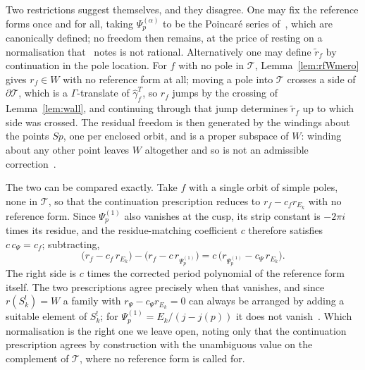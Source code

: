 \documentclass[11pt]{article}
\begin{document}
Two restrictions suggest themselves, and they disagree. One may fix the reference forms once and for
all, taking $\Psi^{(\alpha)}_p$ to be the Poincar\'e series of~\cite[Def.\ 3.1]{BrownFonseca2025},
which are canonically defined; no freedom then remains, at the price of resting on a normalisation
that~\cite[Rem.\ 5.17]{BrownFonseca2025} notes is not rational. Alternatively one may define
$\tilde r_f$ by continuation in the pole location. For $f$ with no pole in $\mathcal{T}$,
Lemma~\ref{lem:rfWmero} gives $r_f\in W$ with no reference form at all; moving a pole into
$\mathcal{T}$ crosses a side of $\partial\mathcal{T}$, which is a $\Gamma$-translate of
$\hat\gamma^T_f$, so $r_f$ jumps by the crossing of Lemma~\ref{lem:wall}, and continuing through
that jump determines $\tilde r_f$ up to which side was crossed. The residual freedom is then
generated by the windings about the points $Sp$, one per enclosed orbit, and is a proper subspace of
$W$: winding about any other point leaves $W$ altogether and so is not an admissible
correction~\cite{VerifyScripts}.

The two can be compared exactly. Take $f$ with a single orbit of simple poles, none in
$\mathcal{T}$, so that the continuation prescription reduces to $r_f-c_fr_{E_k}$ with no reference
form. Since $\Psi^{(1)}_p$ also vanishes at the cusp, its strip constant is $-2\pi i$ times its
residue, and the residue-matching coefficient $c$ therefore satisfies $c\,c_\Psi=c_f$; subtracting,
\begin{equation}\label{eq:prescdiff}
\big(r_f-c_f\,r_{E_k}\big)-\big(r_f-c\,r_{\Psi^{(1)}_p}\big)
=c\,\big(r_{\Psi^{(1)}_p}-c_\Psi\,r_{E_k}\big) .
\end{equation}
The right side is $c$ times the corrected period polynomial of the reference form itself. The two
prescriptions agree precisely when that vanishes, and since $r(S^!_k)=W$ a family with
$r_{\Psi}-c_\Psi r_{E_k}=0$ can always be arranged by adding a suitable element of $S^!_k$;
for $\Psi^{(1)}_p=E_k/(j-j(p))$ it does not vanish~\cite{VerifyScripts}. Which normalisation is the
right one we leave open, noting only that the continuation prescription agrees by construction with
the unambiguous value on the complement of $\mathcal{T}$, where no reference form is called for.
\end{document}
